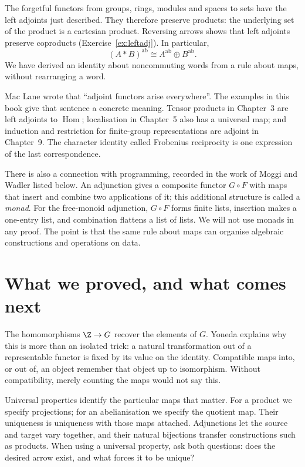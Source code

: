The forgetful functors from groups, rings, modules and spaces to sets have the left adjoints just described. They therefore preserve products: the underlying set of the product is a cartesian product. Reversing arrows shows that left adjoints preserve coproducts (Exercise~\ref{ex:leftadj}). In particular,
\[
(A*B)^{\mathrm{ab}}\cong A^{\mathrm{ab}}\oplus B^{\mathrm{ab}}.
\]
We have derived an identity about noncommuting words from a rule about maps, without rearranging a word.

\begin{beauty}
Mac Lane wrote that ``adjoint functors arise everywhere''. The examples in this book give that sentence a concrete meaning. Tensor products in Chapter~3 are left adjoints to $\operatorname{Hom}$; localisation in Chapter~5 also has a universal map; and induction and restriction for finite-group representations are adjoint in Chapter~9. The character identity called Frobenius reciprocity is one expression of the last correspondence.

There is also a connection with programming, recorded in the work of Moggi and Wadler listed below. An adjunction gives a composite functor $G\circ F$ with maps that insert and combine two applications of it; this additional structure is called a \emph{monad}. For the free-monoid adjunction, $G\circ F$ forms finite lists, insertion makes a one-entry list, and combination flattens a list of lists. We will not use monads in any proof. The point is that the same rule about maps can organise algebraic constructions and operations on data.
\end{beauty}

\section{What we proved, and what comes next}

The homomorphisms $\Z\to G$ recover the elements of $G$. Yoneda explains why this is more than an isolated trick: a natural transformation out of a representable functor is fixed by its value on the identity. Compatible maps into, or out of, an object remember that object up to isomorphism. Without compatibility, merely counting the maps would not say this.

Universal properties identify the particular maps that matter. For a product we specify projections; for an abelianisation we specify the quotient map. Their uniqueness is uniqueness with those maps attached. Adjunctions let the source and target vary together, and their natural bijections transfer constructions such as products. When using a universal property, ask both questions: does the desired arrow exist, and what forces it to be unique?

